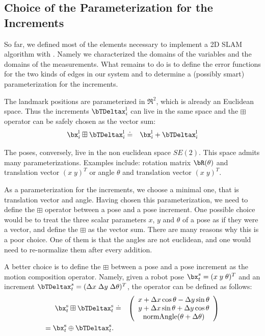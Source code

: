 \documentclass[a4paper]{article}
\begin{document}
\subsection{Choice of the Parameterization for the Increments}
So far, we defined most of the elements necessary to implement a 2D
SLAM algorithm with \gopt{}.  Namely we characterized the domains of
the variables and the domains of the measurements.  What remains to do
is to define the error functions for the two kinds of edges in our
system and to determine a (possibly smart) parameterization for the
increments.


The landmark positions are parameterized in $\Re^2$, which is already
an Euclidean space. Thus the increments $\bTDeltax^\mathrm{l}_i$ can live in the same space and the
 $\boxplus$ operator can be safely chosen as the vector sum:
\begin{eqnarray}
  \bx^\mathrm{l}_i \boxplus \bTDeltax^\mathrm{l}_i   & \doteq & \bx^\mathrm{l}_i + \bTDeltax^\mathrm{l}_i
\end{eqnarray}

The poses, conversely, live in the non euclidean space $SE(2)$.
This space admits many parameterizations. Examples include:
rotation matrix $\bR(\theta)$ and translation vector $(x \; y)^T$ or
angle $\theta$ and translation vector $(x \; y)^T$.

As a parameterization for the increments, we choose a minimal one,
that is translation vector and angle. Having chosen this
parameterization, we need to define the $\boxplus$ operator between a
pose and a pose increment.  One possible choice would be to treat the
three scalar parameters $x$, $y$ and $\theta$ of a pose as if they
were a vector, and define the $\boxplus$ as the vector sum.  There are
many reasons why this is a poor choice. One of them is that the angles
are not euclidean, and one would need to re-normalize them after every
addition.

A better choice is to define the $\boxplus$ between a pose and a pose
increment as the motion composition operator. Namely, given a robot
pose $\bx^{s}_t = (x\; y\; \theta)^T$ and an increment $\bTDeltax^{s}_t
= (\Delta x\; \Delta y\; \Delta \theta)^T$, the operator can be defined as
follows:
\begin{eqnarray}
    \bx^\mathrm{s}_t \boxplus \bTDeltax^\mathrm{s}_t   & \doteq & 
    \left( 
    \begin{array}{c}
      x + \Delta x \cos \theta - \Delta y \sin \theta \\
      y + \Delta x \sin \theta + \Delta y \cos \theta \\
      \mathrm{normAngle}(\theta + \Delta \theta)
    \end{array}
    \right)\\
    = \bx^\mathrm{s}_t \oplus \bTDeltax^\mathrm{s}_t.
\end{eqnarray}
\end{document}
